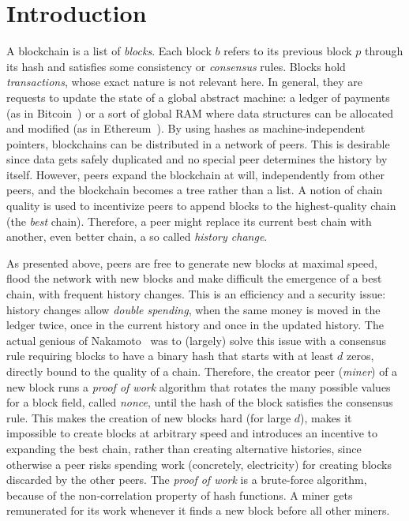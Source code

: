 \section{Introduction}\label{sec:introduction}

A blockchain is a list of \emph{blocks}.
Each block $b$ refers to its previous block $p$ through its hash
and satisfies some consistency or \emph{consensus} rules.
Blocks hold \emph{transactions}, whose exact nature is not relevant here.
In general, they are requests to update the state of a global abstract machine:
a ledger of payments (as in Bitcoin~\cite{Nakamoto08,Antonopoulos17})
or a sort of global RAM where data structures can be allocated and modified
(as in Ethereum~\cite{AntonopoulosW18}).
By using hashes as machine-independent
pointers, blockchains can be distributed in a network of peers.
This is desirable since data gets safely duplicated
and no special peer determines the history by itself.
However, peers expand the blockchain at will, independently from other
peers, and the blockchain becomes a tree rather than a list.
A notion of chain quality is used to incentivize peers to append blocks to the highest-quality chain
(the \emph{best} chain).
Therefore, a peer might replace its current best chain with another, even better chain,
a so called \emph{history change}.

As presented above, peers are free to generate new blocks at maximal speed, flood the network
with new blocks and make difficult the emergence of a best chain, with frequent history changes.
This is an efficiency and a security issue: history changes allow
\emph{double spending}, when the same money is moved in the ledger twice, once in the current history
and once in the updated history. The actual genious of Nakamoto~\cite{Nakamoto08} was to
(largely) solve this issue with a consensus rule requiring blocks to have a binary hash
that starts with at least $d$ zeros, directly bound to the quality of a chain.
Therefore, the creator peer (\emph{miner}) of a new block runs a \emph{proof of work} algorithm
that rotates the many possible values for a block field, called \emph{nonce}, until
the hash of the block satisfies the consensus rule. This makes the creation of new blocks hard
(for large $d$), makes it impossible to create blocks at arbitrary speed and introduces an
incentive to expanding the best chain, rather than creating alternative histories, since
otherwise a peer
risks spending work (concretely, electricity) for creating blocks discarded
by the other peers. The \emph{proof of work} is a brute-force algorithm,
because of the non-correlation property of hash functions.
A miner gets remunerated for its work whenever it finds a new block before all other miners.

